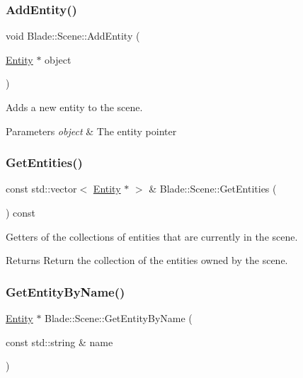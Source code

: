 \subsubsection{\texorpdfstring{Add\+Entity()}{AddEntity()}}
{\footnotesize\ttfamily void Blade\+::\+Scene\+::\+Add\+Entity (\begin{DoxyParamCaption}\item[{\hyperlink{class_blade_1_1_entity}{Entity} $\ast$}]{object }\end{DoxyParamCaption})\hspace{0.3cm}{\ttfamily [noexcept]}}



Adds a new entity to the scene. 


\begin{DoxyParams}{Parameters}
{\em object} & The entity pointer \\
\hline
\end{DoxyParams}
\mbox{\label{class_blade_1_1_scene_abd8993ff5deae13c05bfcdffbe9af6ff}} 
\subsubsection{\texorpdfstring{Get\+Entities()}{GetEntities()}}
{\footnotesize\ttfamily const std\+::vector$<$ \hyperlink{class_blade_1_1_entity}{Entity} $\ast$ $>$ \& Blade\+::\+Scene\+::\+Get\+Entities (\begin{DoxyParamCaption}{ }\end{DoxyParamCaption}) const\hspace{0.3cm}{\ttfamily [noexcept]}}



Getters of the collections of entities that are currently in the scene. 

\begin{DoxyReturn}{Returns}
Return the collection of the entities owned by the scene. 
\end{DoxyReturn}
\mbox{\label{class_blade_1_1_scene_a4aa00824c68cf68734f85ac465796385}} 
\subsubsection{\texorpdfstring{Get\+Entity\+By\+Name()}{GetEntityByName()}}
{\footnotesize\ttfamily \hyperlink{class_blade_1_1_entity}{Entity} $\ast$ Blade\+::\+Scene\+::\+Get\+Entity\+By\+Name (\begin{DoxyParamCaption}\item[{const std\+::string \&}]{name }\end{DoxyParamCaption})\hspace{0.3cm}{\ttfamily [noexcept]}}



